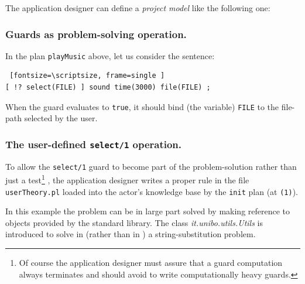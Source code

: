 \medskip 
\scriptsize
{}
\normalsize
\medskip    

The application designer can define a \textit{project model} like the following one:

  

\subsubsection{Guards as problem-solving operation.}
In the plan \texttt{playMusic} above, let us consider the sentence:
\begin{Verbatim} [fontsize=\scriptsize, frame=single ]	
[ !? select(FILE) ] sound time(3000) file(FILE) ;
\end{Verbatim}
When the guard evaluates to \texttt{true}, it should bind (the variable) \texttt{FILE} to the file-path selected by the user. 

\subsubsection{The user-defined \texttt{select/1} operation.}
To allow the \texttt{select/1} guard to become part of the problem-solution rather than just a test\footnote{Of course the application designer must assure that a guard computation always terminates and should avoid to write computationally heavy guards.} , the application designer writes a proper rule in the \tuprolog{} file \texttt{userTheory.pl} loaded into the actor's knowledge base by the \texttt{init} plan (at \texttt{(1)}).



In this example the problem can be in large part solved by making reference to objects provided by the standard \java{} library. The class \textit{it.unibo.utils.Utils} is introduced to solve in \java{} (rather than in \prolog{}) a string-substitution problem.

